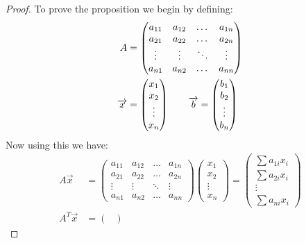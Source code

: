 \documentclass[12pt, letterpaper, onecolumn, conference, final]{IEEEtran}
\theoremstyle{definition}
\theoremstyle{plain}
\begin{document}
\begin{proof}
To prove the proposition we begin by defining:
\begin{equation*}
\begin{split}
A &= \begin{pmatrix}
a_{11} & a_{12} & \dots & a_{1n} \\
a_{21} & a_{22} & \dots & a_{2n} \\
\vdots & \vdots & \ddots & \vdots \\
a_{n1} & a_{n2} & \dots & a_{nn}
\end{pmatrix} \\
\overrightarrow{x} &= \begin{pmatrix}
x_1 \\
x_2 \\
\vdots \\
x_n
\end{pmatrix} \hspace{.7cm} \overrightarrow{b} = \begin{pmatrix}
b_1 \\
b_2 \\
\vdots \\
b_n
\end{pmatrix}
\end{split}
\end{equation*}
\noindent
Now using this we have:
\renewcommand*{\arraystretch}{1.2}
\begin{equation*}
\begin{split}
A\overrightarrow{x} &= \begin{pmatrix}
a_{11} & a_{12} & \dots & a_{1n} \\
a_{21} & a_{22} & \dots & a_{2n} \\
\vdots & \vdots & \ddots & \vdots \\
a_{n1} & a_{n2} & \dots & a_{nn}
\end{pmatrix} \begin{pmatrix}
x_1 \\
x_2 \\
\vdots \\
x_n
\end{pmatrix} = \begin{pmatrix}
\sum a_{1i}x_i \\
\sum a_{2i}x_i \\
\vdots \\
\sum a_{ni}x_i
\end{pmatrix} \\
A^T\overrightarrow{x} &= \begin{pmatrix}

\end{pmatrix}
\end{split}
\end{equation*}
\end{proof}
\end{document}
